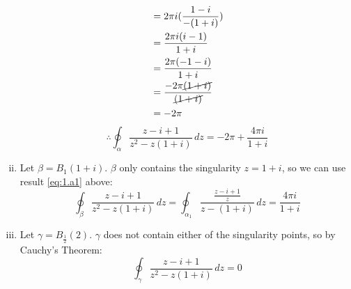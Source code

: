 \documentclass[a4paper, titlepage, DIV=14]{scrartcl}
\begin{document}
\begin{enumerate}[i)]
\begin{align*}
                &= 2\pi i (\frac{1-i}{-(1+i)}) \\
                &= \frac{2\pi i(i-1)}{1+i} \\
                &= \frac{2\pi (-1-i)}{1+i} \\
                &= \frac{-2\pi\cancel{(1+i)}}{\cancel{(1+i)}} \\
                &= -2\pi
        \end{align*}
        \begin{equation*}
            \therefore \oint_{\alpha} \frac{z-i+1}{z^{2}-z(1+i)} \, dz = -2\pi + \frac{4\pi i}{1+i}
        \end{equation*}
        
        \item Let $\beta=B_{1}(1+i)$. $\beta$ only contains the singularity $z=1+i$, so we can use result
        \eqref{eq:1.a1} above:
        \begin{equation*}
            \oint_{\beta} \frac{z-i+1}{z^{2}-z(1+i)} \, dz = \oint_{\alpha_{1}} \frac{\frac{z-i+1}{z}}{z-(1+i)} \, dz = \frac{4\pi i}{1+i} 
        \end{equation*}
        
        \item Let $\gamma=B_{\frac{1}{2}}(2)$. $\gamma$ does not contain either of the singularity points, so by Cauchy's Theorem:
        \begin{equation*}
            \oint_{\gamma} \frac{z-i+1}{z^{2}-z(1+i)} \, dz = 0
        \end{equation*}
    \end{enumerate}
\end{document}
